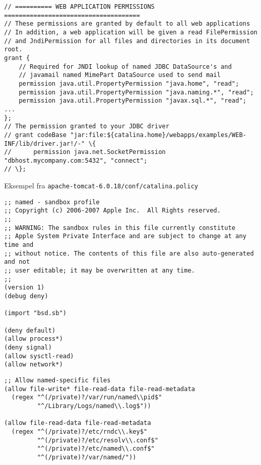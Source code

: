 \documentclass[Screen16to9,17pt]{foils}
\begin{document}
\begin{verbatim}
// ========== WEB APPLICATION PERMISSIONS =====================================
// These permissions are granted by default to all web applications
// In addition, a web application will be given a read FilePermission
// and JndiPermission for all files and directories in its document root.
grant {
    // Required for JNDI lookup of named JDBC DataSource's and
    // javamail named MimePart DataSource used to send mail
    permission java.util.PropertyPermission "java.home", "read";
    permission java.util.PropertyPermission "java.naming.*", "read";
    permission java.util.PropertyPermission "javax.sql.*", "read";
...
};
// The permission granted to your JDBC driver
// grant codeBase "jar:file:${catalina.home}/webapps/examples/WEB-INF/lib/driver.jar!/-" \{
//      permission java.net.SocketPermission "dbhost.mycompany.com:5432", "connect";
// \};
\end{verbatim}

\begin{list1}
\item Eksempel fra \verb+apache-tomcat-6.0.18/conf/catalina.policy+
\end{list1}



\begin{verbatim}
;; named - sandbox profile
;; Copyright (c) 2006-2007 Apple Inc.  All Rights reserved.
;;
;; WARNING: The sandbox rules in this file currently constitute
;; Apple System Private Interface and are subject to change at any time and
;; without notice. The contents of this file are also auto-generated and not
;; user editable; it may be overwritten at any time.
;;
(version 1)
(debug deny)

(import "bsd.sb")

(deny default)
(allow process*)
(deny signal)
(allow sysctl-read)
(allow network*)
\end{verbatim}



\begin{verbatim}
;; Allow named-specific files
(allow file-write* file-read-data file-read-metadata
  (regex "^(/private)?/var/run/named\\pid$"
         "^/Library/Logs/named\\.log$"))

(allow file-read-data file-read-metadata
  (regex "^(/private)?/etc/rndc\\.key$"
         "^(/private)?/etc/resolv\\.conf$"
         "^(/private)?/etc/named\\.conf$"
         "^(/private)?/var/named/"))
\end{verbatim}
\end{document}
